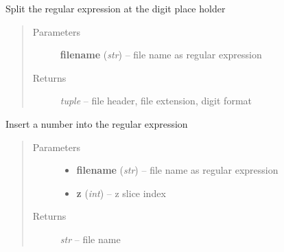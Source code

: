 \documentclass[letterpaper,10pt,english]{sphinxmanual}
\begin{document}

\begin{fulllineitems}
\label{api/ClearMap.IO:ClearMap.IO.FileList.splitFileExpression}
Split the regular expression at the digit place holder
\begin{quote}\begin{description}
\item[{Parameters}] \leavevmode
\textbf{filename} (\emph{str}) --
file name as regular expression

\item[{Returns}] \leavevmode
\emph{tuple} --
file header, file extension, digit format

\end{description}\end{quote}

\end{fulllineitems}


\begin{fulllineitems}
\label{api/ClearMap.IO:ClearMap.IO.FileList.fileExperssionToFileName}
Insert a number into the regular expression
\begin{quote}\begin{description}
\item[{Parameters}] \leavevmode\begin{itemize}
\item {} 
\textbf{filename} (\emph{str}) --
file name as regular expression

\item {} 
\textbf{z} (\emph{int}) --
z slice index

\end{itemize}

\item[{Returns}] \leavevmode
\emph{str} --
file name

\end{description}\end{quote}

\end{fulllineitems}

\end{document}
